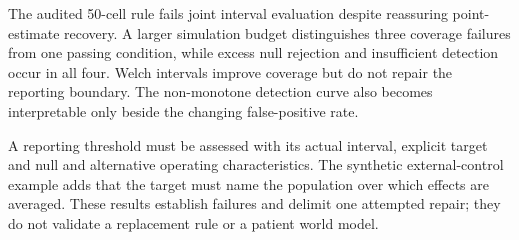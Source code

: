 The audited 50-cell rule fails joint interval evaluation despite reassuring
point-estimate recovery. A larger simulation budget distinguishes three
coverage failures from one passing condition, while excess null rejection
and insufficient detection occur in all four. Welch intervals improve coverage
but do not repair the reporting boundary. The non-monotone detection curve
also becomes interpretable only beside the changing false-positive rate.

A reporting threshold must be assessed with its actual interval, explicit
target and null and alternative operating characteristics. The synthetic
external-control example adds that the target must name the population over
which effects are averaged. These results establish failures and delimit one
attempted repair; they do not validate a replacement rule or a patient world
model.
